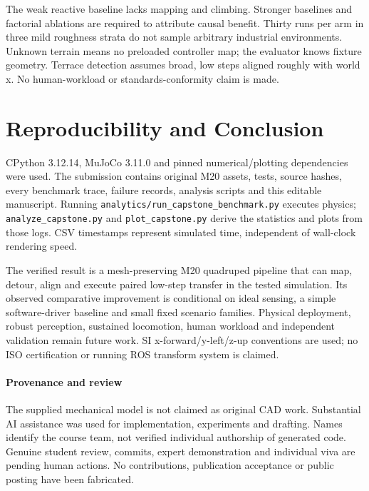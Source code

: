 \documentclass[conference]{IEEEtran}
\begin{document}
The weak reactive baseline lacks mapping and climbing. Stronger baselines and factorial ablations are required to attribute causal benefit. Thirty runs per arm in three mild roughness strata do not sample arbitrary industrial environments. Unknown terrain means no preloaded controller map; the evaluator knows fixture geometry. Terrace detection assumes broad, low steps aligned roughly with world x. No human-workload or standards-conformity claim is made.

\section{Reproducibility and Conclusion}
CPython 3.12.14, MuJoCo 3.11.0 and pinned numerical/plotting dependencies were used. The submission contains original M20 assets, tests, source hashes, every benchmark trace, failure records, analysis scripts and this editable manuscript. Running \texttt{analytics/run\_capstone\_benchmark.py} executes physics; \texttt{analyze\_capstone.py} and \texttt{plot\_capstone.py} derive the statistics and plots from those logs. CSV timestamps represent simulated time, independent of wall-clock rendering speed.



The verified result is a mesh-preserving M20 quadruped pipeline that can map, detour, align and execute paired low-step transfer in the tested simulation. Its observed comparative improvement is conditional on ideal sensing, a simple software-driver baseline and small fixed scenario families. Physical deployment, robust perception, sustained locomotion, human workload and independent validation remain future work. SI x-forward/y-left/z-up conventions are used; no ISO certification or running ROS transform system is claimed.

\paragraph{Provenance and review} The supplied mechanical model is not claimed as original CAD work. Substantial AI assistance was used for implementation, experiments and drafting. Names identify the course team, not verified individual authorship of generated code. Genuine student review, commits, expert demonstration and individual viva are pending human actions. No contributions, publication acceptance or public posting have been fabricated.
\end{document}
